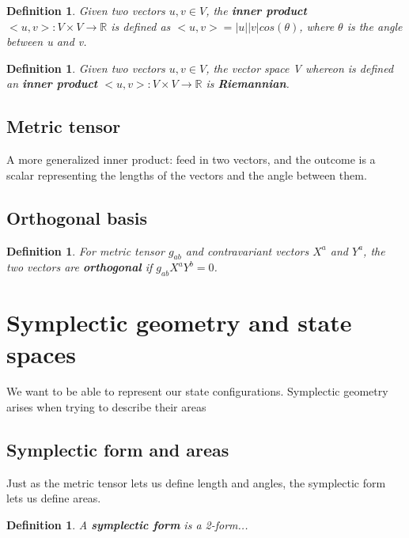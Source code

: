 \documentclass{book}
\newtheorem{defn}[equation]{Definition}
\begin{document}
\begin{defn}
	Given two vectors $u,v \in V$, the \textbf{inner product} $<u,v> : V \times V \to \mathbb{R}$ is defined as $<u,v> = |u||v|cos(\theta)$, where $\theta$ is the angle between u and v. 
\end{defn}
\begin{defn}
	Given two vectors $u,v \in V$, the vector space V whereon is defined an \textbf{inner product} $<u,v> : V \times V \to \mathbb{R}$ is \textbf{Riemannian}.
	\end{defn}


\subsection{Metric tensor}
A more generalized inner product: feed in two vectors, and the outcome is a scalar representing the lengths of the vectors and the angle between them. 

\subsection{Orthogonal basis}

\begin{defn}
	For metric tensor $g_{ab}$ and contravariant vectors $X^a$ and $Y^a$, the two vectors are \textbf{orthogonal} if $g_{ab}X^aY^b = 0$. 
\end{defn}

\section{Symplectic geometry and state spaces}
We want to be able to represent our state configurations. Symplectic geometry arises when trying to describe their areas

\subsection{Symplectic form and areas}
Just as the metric tensor lets us define length and angles, the symplectic form lets us define areas.

\begin{defn}
	A \textbf{symplectic form} is a 2-form...
\end{defn} 
\end{document}

